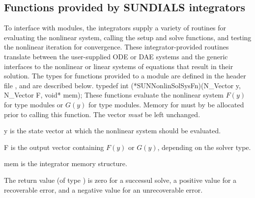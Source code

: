 \subsection{Functions provided by SUNDIALS integrators}
\label{ss:sunnonlinsol_sunsuppliedfn}

To interface with {\sunnonlinsol} modules, the {\sundials} integrators
supply a variety of routines for evaluating the nonlinear system,
calling the {\sunlinsol} setup and solve functions, and testing the
nonlinear iteration for convergence.  These integrator-provided routines
translate between the user-supplied ODE or DAE systems and the generic
interfaces to the nonlinear or linear systems of equations that result
in their solution. The types for functions provided to a {\sunnonlinsol}
module are defined in the header file
, and are described below.
{
  typedef int (*SUNNonlinSolSysFn)(N\_Vector y, N\_Vector F, void* mem);
}
{
  These functions evaluate the nonlinear system $F(y)$
  for  type modules or $G(y)$
  for  type modules. Memory
  for  must by be allocated prior to calling this function. The
  vector  \textit{must} be left unchanged.
}
{
  \begin{args}[mem]
  \item[y]
    is the state vector at which the nonlinear system should be evaluated.
  \item[F]
    is the output vector containing $F(y)$ or $G(y)$, depending on the
    solver type.
  \item[mem]
    is the {\sundials} integrator memory structure.
  \end{args}
}
{
  The return value  (of type ) is zero for a
  successul solve, a positive value for a recoverable error, and a
  negative value for an unrecoverable error.
}
